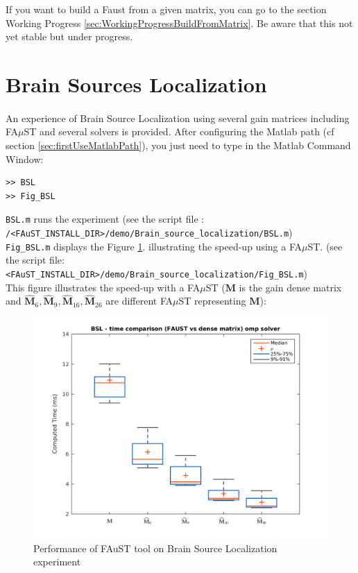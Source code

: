 If you want to build a Faust from a given matrix, you can go to the section Working Progress \ref{sec:WorkingProgressBuildFromMatrix}.
Be aware that this not yet stable but under progress.



\section{Brain Sources Localization}\label{sec:BSL_example}
%
\paragraph{} An experience of Brain Source Localization using several gain matrices including FA$\mu$ST and several solvers is provided. After configuring the Matlab path (cf section \ref{sec:firstUseMatlabPath}), you just need to type in the Matlab Command Window:

\lstset{style=customMatlab}
\begin{lstlisting}
>> BSL
>> Fig_BSL
\end{lstlisting}

\texttt{BSL.m} runs the experiment (see the script file :\\
\texttt{/<FAuST\_INSTALL\_DIR>/demo/Brain\_source\_localization/BSL.m})\\
\texttt{Fig\_BSL.m} displays the Figure \ref{fig:BSL}. illustrating the speed-up using a FA$\mu$ST. (see the script file:\\
\texttt{<FAuST\_INSTALL\_DIR>/demo/Brain\_source\_localization/Fig\_BSL.m}) \\

This figure illustrates the speed-up with a FA$\mu$ST ($\mathbf{M}$ is the gain dense matrix and $\widehat{\mathbf{M}}_{6},\widehat{\mathbf{M}}_{9},\widehat{\mathbf{M}}_{16},\widehat{\mathbf{M}}_{26}$ are different FA$\mu$ST representing  $\mathbf{M}$):


\begin{figure}[H] %
\centering
\includegraphics[scale=0.7]{images/BSL.png}
\caption{Performance of FAuST tool on Brain Source Localization experiment}
\label{fig:BSL}
\end{figure}






 
